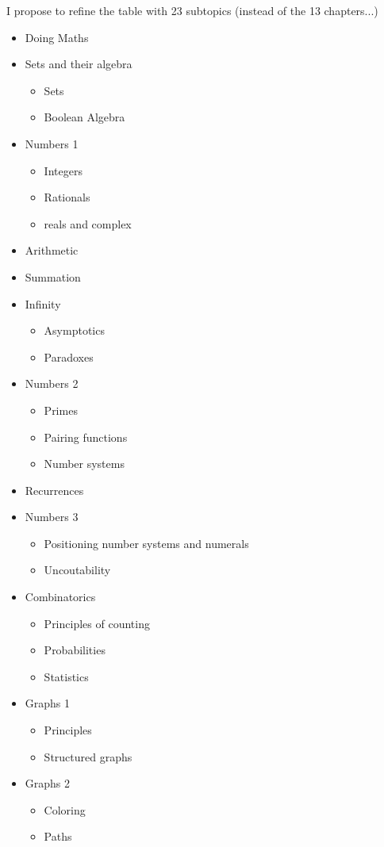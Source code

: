 \documentclass{article}
\begin{document}
I propose to refine the table with 23 subtopics (instead of the 13 chapters...)
\begin{itemize}
\item
Doing Maths
\item
Sets and their algebra
\begin{itemize}
\item
Sets 
\item
Boolean Algebra
\end{itemize}
\item
Numbers 1
\begin{itemize}
\item
Integers 
\item
Rationals
\item reals and complex
\end{itemize}
\item Arithmetic
\item Summation
\item Infinity
\begin{itemize}
\item
Asymptotics
\item
Paradoxes
\end{itemize}
\item Numbers 2
\begin{itemize}
\item
Primes 
\item
Pairing functions
\item
Number systems
\end{itemize}
\item Recurrences
\item
Numbers 3
\begin{itemize}
\item
Positioning number systems  and numerals
\item
Uncoutability
\end{itemize}
\item
Combinatorics
\begin{itemize}
\item
Principles of counting
\item
Probabilities
\item
Statistics
\end{itemize}
\item Graphs 1
\begin{itemize}
\item
Principles
\item
Structured graphs
\end{itemize}
\item Graphs 2
\begin{itemize}
\item
Coloring 
\item
Paths
\end{itemize}
\end{itemize}
\bigskip
\end{document}
